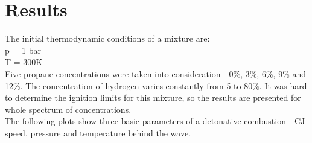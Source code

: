 \documentclass[11pt,a4paper]{article}
\begin{document}
\section{Results}\label{sec:results}
The initial thermodynamic conditions of a mixture are:\\
p = 1 bar\\
T = 300K\\

Five propane concentrations were taken into consideration - 0\%, 3\%, 6\%, 9\% and 12\%. The concentration of hydrogen varies constantly from 5 to 80\%. It was hard to determine the ignition limits for this mixture, so the results are presented for whole spectrum of concentrations.\\
The following plots show three basic parameters of a detonative combustion - CJ speed, pressure and temperature behind the wave.
\end{document}
